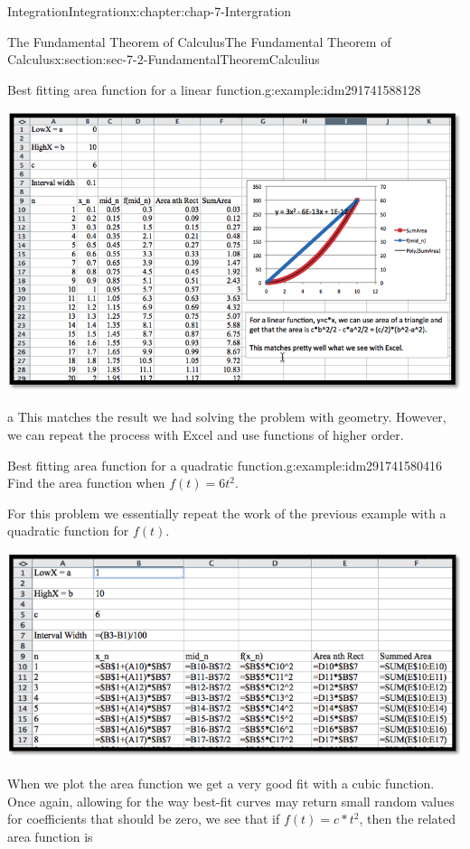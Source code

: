 \documentclass[oneside,10pt,]{book}
\numberwithin{equation}{section}
\begin{document}
\begin{chapterptx}{Integration}{}{Integration}{}{}{x:chapter:chap-7-Intergration}
\begin{sectionptx}{The Fundamental Theorem of Calculus}{}{The Fundamental Theorem of Calculus}{}{}{x:section:sec-7-2-FundamentalTheoremCalculius}
\begin{example}{Best fitting area function for a linear function.}{g:example:idm291741588128}
\begin{sidebyside}{1}{0.1}{0.1}{0}
\begin{sbspanel}{0.8}
\includegraphics[width=\linewidth]{images/sec7-2-5.png}
\end{sbspanel}%
\end{sidebyside}%
\end{example}
 a This matches the result we had solving the problem with geometry.  However, we can repeat the process with Excel and use functions of higher order.%
\begin{example}{Best fitting area function for a quadratic function.}{g:example:idm291741580416}%
Find the area function when \(f(t) = 6t^2\).%
\par
For this problem we essentially repeat the work of the previous example with a quadratic function for \(f(t)\).%
\begin{sidebyside}{1}{0.05}{0.05}{0}%
\begin{sbspanel}{0.9}%
\includegraphics[width=\linewidth]{images/sec7-2-6.png}
\end{sbspanel}%
\end{sidebyside}%
\par
When we plot the area function we get a very good fit with a cubic function.  Once again, allowing for the way best-fit curves may return small random values for coefficients that should be zero, we see that if \(f(t) =c*t^2\), then the related area function is%

\end{example}
\end{sectionptx}
\end{chapterptx}
\end{document}
